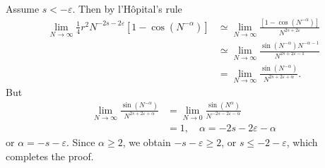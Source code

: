 \documentclass[12pt,reqno]{amsart}
\numberwithin{equation}{section}  %
\newcommand{\ee}{\varepsilon}
\begin{document}
%
%
Assume $s < -\ee$. Then by l'H\^opital's rule
%
%
\begin{equation*}
\begin{split}
  \lim_{N \to \infty} \frac{1}{4} r^{2} N^{-2s -2 \ee}  
[1 - \cos(N^{-\alpha})]
& \simeq \lim_{N \to \infty} \frac{[1 - \cos(N^{-\alpha})]}{N^{2s + 2\ee}}
\\
& \simeq \lim_{N \to \infty}  \frac{\sin(N^{-\alpha}) N^{-\alpha -1}}{N^{2s + 2\ee - 1}}
\\
& = \lim_{N \to \infty} \frac{\sin(N^{-\alpha})}{N^{2s + 2 \ee + \alpha}}.
\end{split}
\end{equation*}
%
%
But
%
%
\begin{equation*}
\begin{split}
  \lim_{N \to \infty} \frac{\sin(N^{-\alpha})}{N^{2s + 2 \ee + \alpha}}
  & = \lim_{N \to 0}\frac{\sin(N^{\alpha})}{N^{-2s - 2 \ee - \alpha}}
  \\
  & = 1, \quad \alpha = -2s -2 \ee - \alpha
\end{split}
\end{equation*}
%
%
or $\alpha = -s -\ee $. Since $\alpha \ge 2$, we obtain
%
%
$-s - \ee  \ge 2$, or $s \le -2 - \ee$, which completes the proof.
\qquad \qedsymbol
%
%
%
%
%
%
%
%
%
%
%
%
%
%
%
%
\end{document}
